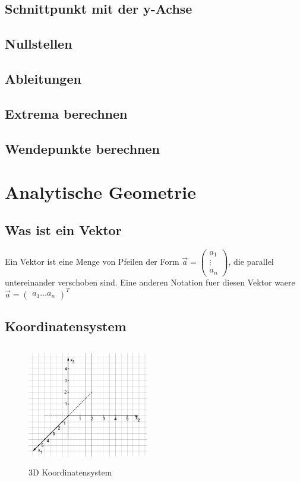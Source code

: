 \documentclass[a4paper]{article} %
\begin{document}
	\subsection{Schnittpunkt mit der y-Achse}
	\subsection{Nullstellen}
	\subsection{Ableitungen}
	\subsection{Extrema berechnen}
	\subsection{Wendepunkte berechnen}
	\section{Analytische Geometrie}
	\subsection{Was ist ein Vektor}
	Ein Vektor ist eine Menge von Pfeilen der Form $\vec{a} = \begin{pmatrix} a_1 \\ \vdots \\ a_n \end{pmatrix} $, die parallel untereinander verschoben sind.
	Eine anderen Notation fuer diesen Vektor waere $\vec{a} = \begin{pmatrix} a_1  \hdots  a_n \end{pmatrix}^T $
	\subsection{Koordinatensystem}
	\begin{minipage}{0.5\textwidth}
			\begin{figure}[H]
				\includegraphics[width=200px, height=200px]{koordinatensystem.png}
					\captionsetup{labelformat=empty}
				\caption{3D Koordinatensystem}
			\end{figure}
		\end{minipage} 
\end{document}
